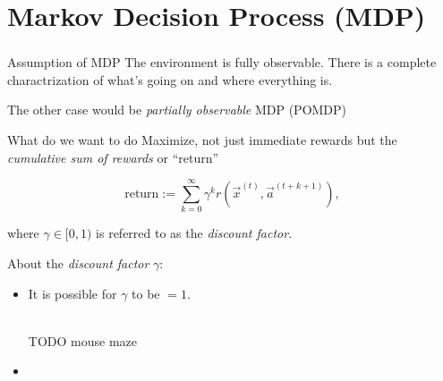 \section{Markov Decision Process (MDP)}




\begin{frame}\frametitle{\secname}

\begin{block}{Assumption of MDP}
The environment is fully observable. There is a complete charactrization of what's going on and where everything is.
\end{block}

The other case would be \emph{partially observable} MDP (POMDP)

\begin{block}{What do we want to do}
Maximize, not just immediate rewards but the \emph{cumulative sum of rewards} or ``return''

\begin{equation}
\text{return
} := \sum_{k=0}^{\infty} \gamma^k r(\vec x^{(t)}, \vec a^{(t+k+1)}),
\end{equation}

where $\gamma \in \lbrack0,1)$ is referred to as the \emph{discount factor}.
 
\end{block}

About the \emph{discount factor} $\gamma$:

\begin{itemize}
\item It is possible for $\gamma$ to be $=1$.\\

\\


TODO mouse maze

\item {}\\


\end{itemize}
\end{frame}
